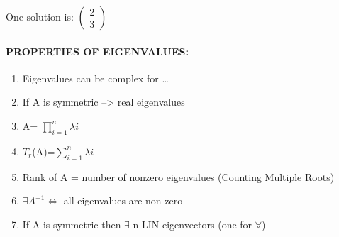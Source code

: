 \documentclass[]{article}
\providecommand{\tightlist}{%
  \setlength{\itemsep}{0pt}\setlength{\parskip}{0pt}}
\let\oldparagraph\paragraph
\renewcommand{\paragraph}[1]{\oldparagraph{#1}\mbox{}}
\begin{document}
One solution is: \(\begin{pmatrix} 2 \\ 3\end{pmatrix}\)

\hspace{3cm}

\paragraph{PROPERTIES OF EIGENVALUES:}\label{properties-of-eigenvalues}

\begin{enumerate}
\def\labelenumi{\roman{enumi})}
\tightlist
\item
  Eigenvalues can be complex for \ldots{}
\item
  If A is symmetric --\textgreater{} real eigenvalues
\item
  \textbar{}A\textbar{}= \(\prod\limits_{i=1}^{n} \lambda{i}\)
\item
  \(T_{r}\)(A)=\(\sum\limits_{i=1}^{n} \lambda{i}\)
\item
  Rank of A = number of nonzero eigenvalues (Counting Multiple Roots)
\item
  \(\exists A^{-1} \Longleftrightarrow\) all eigenvalues are non zero
\item
  If A is symmetric then \(\exists\) n LIN eigenvectors (one for
  \(\forall\))
\end{enumerate}
\end{document}
